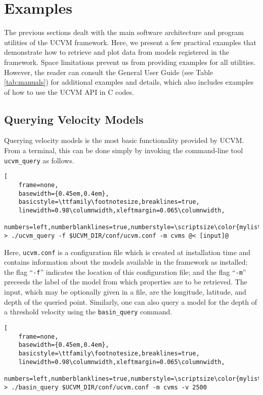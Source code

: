 
\section{Examples}

The previous sections dealt with the main software architecture and program utilities of the UCVM framework. Here, we present a few practical examples that demonstrate how to retrieve and plot data from models registered in the framework. Space limitations prevent us from providing examples for all utilities. However, the reader can consult the General User Guide (see Table \ref{tab:manuals}) for additional examples and details, which also includes examples of how to use the UCVM API in C codes.

\subsection{Querying Velocity Models}

Querying velocity models is the most basic functionality provided by UCVM. From a terminal, this can be done simply by invoking the command-line tool \texttt{ucvm\_query} as follows.

\begin{lstlisting}[
	frame=none,
	basewidth={0.45em,0.4em},
	basicstyle=\ttfamily\footnotesize,breaklines=true,
	linewidth=0.98\columnwidth,xleftmargin=0.065\columnwidth,
	numbers=left,numberblanklines=true,numberstyle=\scriptsize\color{mylistingnclr},style=optional]
> ./ucvm_query -f $UCVM_DIR/conf/ucvm.conf -m cvms @< [input]@
\end{lstlisting}

\noindent
Here, \texttt{ucvm.conf} is a configuration file which is created at installation time and contains information about the models available in the framework as installed; the flag ``\texttt{-f}'' indicates the location of this configuration file; and the flag ``\texttt{-m}'' preceeds the label of the model from which properties are to be retrieved. The input, which may be optionally given in a file, are the longitude, latitude, and depth of the queried point. Similarly, one can also query a model for the depth of a threshold velocity using the \texttt{basin\_query} command.

\begin{lstlisting}[
	frame=none,
	basewidth={0.45em,0.4em},
	basicstyle=\ttfamily\footnotesize,breaklines=true,
	linewidth=0.98\columnwidth,xleftmargin=0.065\columnwidth,
	numbers=left,numberblanklines=true,numberstyle=\scriptsize\color{mylistingnclr}]
> ./basin_query $UCVM_DIR/conf/ucvm.conf -m cvms -v 2500
\end{lstlisting}

